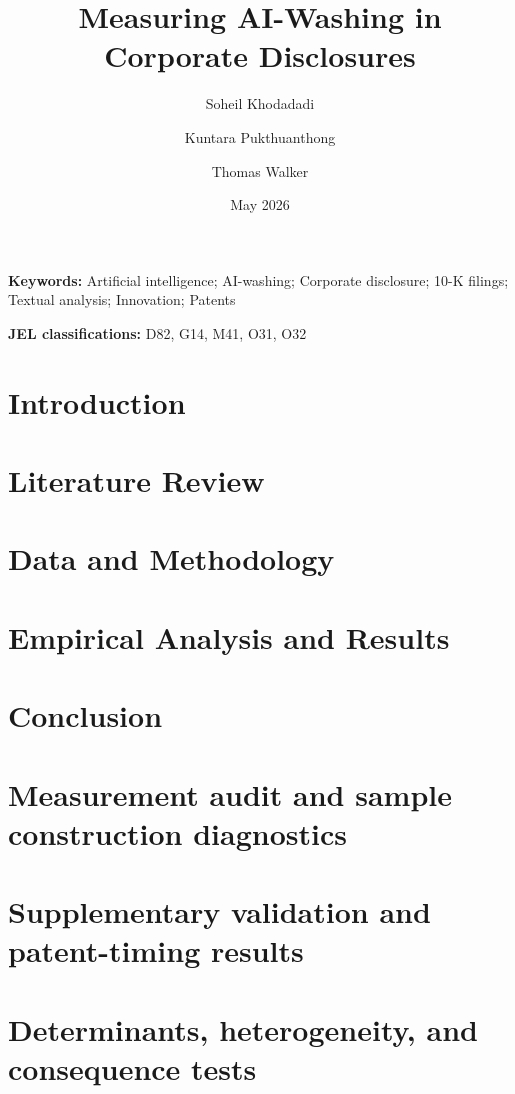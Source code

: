 \documentclass[11pt]{article}
\title{Measuring AI-Washing in Corporate Disclosures}
\author{Soheil Khodadadi \and Kuntara Pukthuanthong \and Thomas Walker}
\date{May 2026}
\begin{document}
\maketitle

\begin{abstract}

\end{abstract}

\noindent\textbf{Keywords:} Artificial intelligence; AI-washing; Corporate disclosure; 10-K filings; Textual analysis; Innovation; Patents

\noindent\textbf{JEL classifications:} D82, G14, M41, O31, O32

\section{Introduction}


\section{Literature Review}


\section{Data and Methodology}


\section{Empirical Analysis and Results}


\section{Conclusion}


\appendix

\renewcommand{\thesection}{Appendix \Alph{section}}
\renewcommand{\thetable}{\Alph{section}\arabic{table}}
\renewcommand{\thefigure}{\Alph{section}\arabic{figure}}

\clearpage
\section{Measurement audit and sample construction diagnostics}


\clearpage
\section{Supplementary validation and patent-timing results}


\clearpage
\section{Determinants, heterogeneity, and consequence tests}


\clearpage

\end{document}
